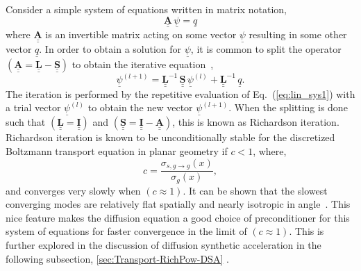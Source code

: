 \noindent
	\indent Consider a simple system of equations written in matrix notation,
	\begin{equation}
		\underline{\underline{\mathbf{A}}}\, \underline{\psi}=\underline{q}	
	\end{equation}
	where ${\underline{\underline{\mathbf{A}}}}$ is an invertible matrix acting on some
	vector ${\underline{\psi}}$ resulting in some other vector $\underline{q}$.  In order to obtain a
	solution for ${\underline{\psi}}$, it is common to split the operator 
	$\left({{\underline{\underline{\mathbf{A}}}}=
	{\underline{\underline{\mathbf{L}}}}-{\underline{\underline{\mathbf{S}}}}}\right)$
	to obtain the iterative equation~\cite{Ada:04},
	\begin{equation}
		\underline{\psi}^{\left({l+1}\right)}=\underline{\underline{\mathbf{L}}}^{-1} \, 
		\underline{\underline{\mathbf{S}}} \,\underline{\psi}^{\left({l} \right)}+
		\underline{\underline{\mathbf{L}}}^{-1} \, \underline{q}.
	\label{eq:lin_sys1}
	\end{equation}
	The iteration is performed by the repetitive evaluation of Eq.~(\ref{eq:lin_sys1}) with a trial
	vector ${\underline{\psi}^{\left({l} \right)}}$ to obtain the new vector 
	${\underline{\psi}^{\left({l+1}\right)}}$.
	When the splitting is done such that $\left({{\underline{\underline{\mathbf{L}}}}=
	{\underline{\underline{\mathbf{I}}}}}\right)$ and $\left({{\underline{\underline{\mathbf{S}}}}=
	{\underline{\underline{\mathbf{I}}}}-{\underline{\underline{\mathbf{A}}}}}\right)$, this is known
	as Richardson iteration.  Richardson iteration is known to be unconditionally stable for the 
	discretized Boltzmann transport equation in planar geometry if ${c<1}$, where,
	\begin{equation}
		c=\frac  {{\sigma}_{s,g\rightarrow{g}}({x})}  {{\sigma}_{g}({x})},
	\label{eq:scat_rat}
	\end{equation}
	and converges very slowly when ${\left(c\approx1\right)}$.  It can be shown that
	the slowest converging modes are relatively flat spatially and nearly isotropic in
	angle~\cite{Ada:04}.  This nice feature makes the diffusion equation a
	good choice of preconditioner for this system of equations for faster convergence in the
	limit of ${\left(c\approx1\right)}$.  This is further explored in the discussion of diffusion
	synthetic acceleration in the following subsection, \ref{sec:Transport-RichPow-DSA} .
	
